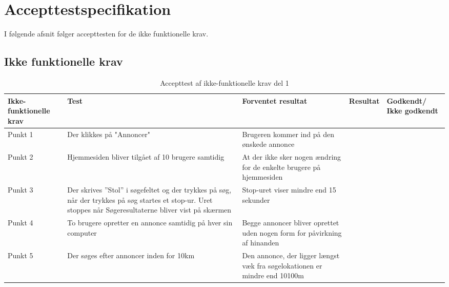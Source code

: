 \chapter{Accepttestspecifikation}\label{ch:Accepttestspecifikation}
I følgende afsnit følger accepttesten for de ikke funktionelle krav.

\section{Ikke funktionelle krav}
\setlength{\arrayrulewidth}{0.3mm}
\setlength{\tabcolsep}{12pt}
\renewcommand{\arraystretch}{1.5}
\begin{table}[H]
	\begin{tabular}{ |p{2.3cm}|p{2.2cm}|p{2.2cm}|p{2.2cm}|p{2.2cm}| } 
		\hline
		\textbf{Ikke-funktionelle krav} & \textbf{Test} & \textbf{Forventet resultat} & \textbf{Resultat} & \textbf{Godkendt/ Ikke godkendt} \\
		\hline
		Punkt 1 & Der klikkes på "Annoncer"  & Brugeren kommer ind på den ønskede annonce &  & \\
		\hline
		Punkt 2 & Hjemmesiden bliver tilgået af 10 brugere samtidig & At der ikke sker nogen ændring for de enkelte brugere på hjemmesiden &  &  \\
		\hline
		Punkt 3 & Der skrives ''Stol'' i søgefeltet og der trykkes på søg, når der trykkes på søg startes et stop-ur. Uret stoppes når Søgeresultaterne bliver vist på skærmen & Stop-uret viser mindre end 15 sekunder &  &  \\
		\hline
		Punkt 4 & To brugere opretter en annonce samtidig på hver sin computer & Begge annoncer bliver oprettet uden nogen form for påvirkning af hinanden  &  & \\
		\hline
		Punkt 5 & Der søges efter annoncer inden for 10km & Den annonce, der ligger længst væk fra søgelokationen er mindre end 10100m &  &  \\
		\hline 
	\end{tabular}
	\caption{Accepttest af ikke-funktionelle krav del 1}
	\label{table:accepttest_ifk1}
\end{table}

